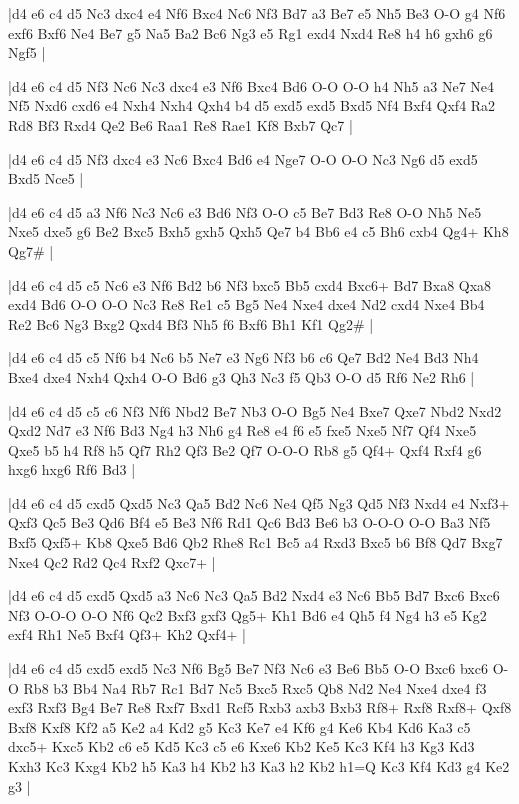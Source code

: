 \whitename{}
\blackname{}
\makegametitle
|d4 e6 c4 d5 Nc3 dxc4 e4 Nf6 Bxc4 Nc6 Nf3 Bd7 a3 Be7 e5 Nh5 Be3 O-O g4 Nf6 exf6 Bxf6 Ne4 Be7 g5 Na5 Ba2 Bc6 Ng3 e5 Rg1 exd4 Nxd4 Re8 h4 h6 gxh6 g6 Ngf5  |

\whitename{}
\blackname{}
\makegametitle
|d4 e6 c4 d5 Nf3 Nc6 Nc3 dxc4 e3 Nf6 Bxc4 Bd6 O-O O-O h4 Nh5 a3 Ne7 Ne4 Nf5 Nxd6 cxd6 e4 Nxh4 Nxh4 Qxh4 b4 d5 exd5 exd5 Bxd5 Nf4 Bxf4 Qxf4 Ra2 Rd8 Bf3 Rxd4 Qe2 Be6 Raa1 Re8 Rae1 Kf8 Bxb7 Qc7  |

\whitename{}
\blackname{}
\makegametitle
|d4 e6 c4 d5 Nf3 dxc4 e3 Nc6 Bxc4 Bd6 e4 Nge7 O-O O-O Nc3 Ng6 d5 exd5 Bxd5 Nce5  |

\whitename{}
\blackname{}
\makegametitle
|d4 e6 c4 d5 a3 Nf6 Nc3 Nc6 e3 Bd6 Nf3 O-O c5 Be7 Bd3 Re8 O-O Nh5 Ne5 Nxe5 dxe5 g6 Be2 Bxc5 Bxh5 gxh5 Qxh5 Qe7 b4 Bb6 e4 c5 Bh6 cxb4 Qg4+ Kh8 Qg7\#  |

\whitename{}
\blackname{}
\makegametitle
|d4 e6 c4 d5 c5 Nc6 e3 Nf6 Bd2 b6 Nf3 bxc5 Bb5 cxd4 Bxc6+ Bd7 Bxa8 Qxa8 exd4 Bd6 O-O O-O Nc3 Re8 Re1 c5 Bg5 Ne4 Nxe4 dxe4 Nd2 cxd4 Nxe4 Bb4 Re2 Bc6 Ng3 Bxg2 Qxd4 Bf3 Nh5 f6 Bxf6 Bh1 Kf1 Qg2\#  |

\whitename{}
\blackname{}
\makegametitle
|d4 e6 c4 d5 c5 Nf6 b4 Nc6 b5 Ne7 e3 Ng6 Nf3 b6 c6 Qe7 Bd2 Ne4 Bd3 Nh4 Bxe4 dxe4 Nxh4 Qxh4 O-O Bd6 g3 Qh3 Nc3 f5 Qb3 O-O d5 Rf6 Ne2 Rh6  |

\whitename{}
\blackname{}
\makegametitle
|d4 e6 c4 d5 c5 c6 Nf3 Nf6 Nbd2 Be7 Nb3 O-O Bg5 Ne4 Bxe7 Qxe7 Nbd2 Nxd2 Qxd2 Nd7 e3 Nf6 Bd3 Ng4 h3 Nh6 g4 Re8 e4 f6 e5 fxe5 Nxe5 Nf7 Qf4 Nxe5 Qxe5 b5 h4 Rf8 h5 Qf7 Rh2 Qf3 Be2 Qf7 O-O-O Rb8 g5 Qf4+ Qxf4 Rxf4 g6 hxg6 hxg6 Rf6 Bd3  |

\whitename{}
\blackname{}
\makegametitle
|d4 e6 c4 d5 cxd5 Qxd5 Nc3 Qa5 Bd2 Nc6 Ne4 Qf5 Ng3 Qd5 Nf3 Nxd4 e4 Nxf3+ Qxf3 Qc5 Be3 Qd6 Bf4 e5 Be3 Nf6 Rd1 Qc6 Bd3 Be6 b3 O-O-O O-O Ba3 Nf5 Bxf5 Qxf5+ Kb8 Qxe5 Bd6 Qb2 Rhe8 Rc1 Bc5 a4 Rxd3 Bxc5 b6 Bf8 Qd7 Bxg7 Nxe4 Qc2 Rd2 Qc4 Rxf2 Qxc7+  |

\whitename{}
\blackname{}
\makegametitle
|d4 e6 c4 d5 cxd5 Qxd5 a3 Nc6 Nc3 Qa5 Bd2 Nxd4 e3 Nc6 Bb5 Bd7 Bxc6 Bxc6 Nf3 O-O-O O-O Nf6 Qc2 Bxf3 gxf3 Qg5+ Kh1 Bd6 e4 Qh5 f4 Ng4 h3 e5 Kg2 exf4 Rh1 Ne5 Bxf4 Qf3+ Kh2 Qxf4+  |

\whitename{}
\blackname{}
\makegametitle
|d4 e6 c4 d5 cxd5 exd5 Nc3 Nf6 Bg5 Be7 Nf3 Nc6 e3 Be6 Bb5 O-O Bxc6 bxc6 O-O Rb8 b3 Bb4 Na4 Rb7 Rc1 Bd7 Nc5 Bxc5 Rxc5 Qb8 Nd2 Ne4 Nxe4 dxe4 f3 exf3 Rxf3 Bg4 Be7 Re8 Rxf7 Bxd1 Rcf5 Rxb3 axb3 Bxb3 Rf8+ Rxf8 Rxf8+ Qxf8 Bxf8 Kxf8 Kf2 a5 Ke2 a4 Kd2 g5 Kc3 Ke7 e4 Kf6 g4 Ke6 Kb4 Kd6 Ka3 c5 dxc5+ Kxc5 Kb2 c6 e5 Kd5 Kc3 c5 e6 Kxe6 Kb2 Ke5 Kc3 Kf4 h3 Kg3 Kd3 Kxh3 Kc3 Kxg4 Kb2 h5 Ka3 h4 Kb2 h3 Ka3 h2 Kb2 h1=Q Kc3 Kf4 Kd3 g4 Ke2 g3  |


